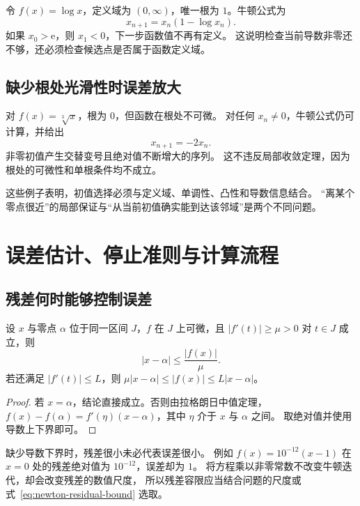 \documentclass[UTF8,12pt,a4paper,fontset=fandol]{ctexart}
\begin{document}
令 $f(x)=\log x$，定义域为 $(0,\infty)$，唯一根为 $1$。牛顿公式为
\[
  x_{n+1}=x_n(1-\log x_n).
\]
如果 $x_0>\mathrm e$，则 $x_1<0$，下一步函数值不再有定义。
这说明检查当前导数非零还不够，还必须检查候选点是否属于函数定义域。

\subsection{缺少根处光滑性时误差放大}

对 $f(x)=\sqrt[3]{x}$，根为 $0$，但函数在根处不可微。
对任何 $x_n\ne0$，牛顿公式仍可计算，并给出
\[
  x_{n+1}=-2x_n.
\]
非零初值产生交替变号且绝对值不断增大的序列。
这不违反局部收敛定理，因为根处的可微性和单根条件均不成立。

这些例子表明，初值选择必须与定义域、单调性、凸性和导数信息结合。
“离某个零点很近”的局部保证与“从当前初值确实能到达该邻域”是两个不同问题。

\section{误差估计、停止准则与计算流程}
\label{sec:newton-stopping}

\subsection{残差何时能够控制误差}

\begin{proposition}[由残差估计误差]\label{prop:newton-residual}
设 $x$ 与零点 $\alpha$ 位于同一区间 $J$，$f$ 在 $J$ 上可微，且
$|f'(t)|\ge\mu>0$ 对 $t\in J$ 成立，则
\begin{equation}\label{eq:newton-residual-bound}
  |x-\alpha|\le\frac{|f(x)|}{\mu}.
\end{equation}
若还满足 $|f'(t)|\le L$，则 $\mu|x-\alpha|\le|f(x)|\le L|x-\alpha|$。
\end{proposition}

\begin{proof}
若 $x=\alpha$，结论直接成立。否则由拉格朗日中值定理，
$f(x)-f(\alpha)=f'(\eta)(x-\alpha)$，其中 $\eta$ 介于 $x$ 与 $\alpha$ 之间。
取绝对值并使用导数上下界即可。
\end{proof}

缺少导数下界时，残差很小未必代表误差很小。
例如 $f(x)=10^{-12}(x-1)$ 在 $x=0$ 处的残差绝对值为 $10^{-12}$，误差却为 $1$。
将方程乘以非零常数不改变牛顿迭代，却会改变残差的数值尺度，
所以残差容限应当结合问题的尺度或式~\eqref{eq:newton-residual-bound} 选取。
\end{document}
